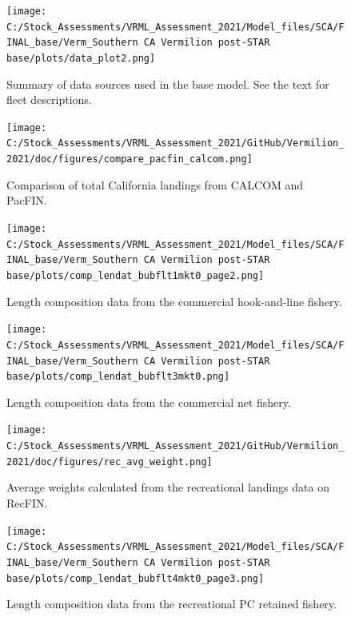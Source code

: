 \documentclass[11pt,
  english,
]{article}
\begin{document}
\begin{figure}
\centering
\texttt{[image: C:/Stock\_Assessments/VRML\_Assessment\_2021/Model\_files/SCA/FINAL\_base/Verm\_Southern CA Vermilion post-STAR base/plots/data\_plot2.png]}
\caption{Summary of data sources used in the base model. See the text for fleet descriptions.\label{fig:data-plot}}
\end{figure}

\begin{figure}
\centering
\texttt{[image: C:/Stock\_Assessments/VRML\_Assessment\_2021/GitHub/Vermilion\_2021/doc/figures/compare\_pacfin\_calcom.png]}
\caption{Comparison of total California landings from CALCOM and PacFIN.\label{fig:calcom-pacfin}}
\end{figure}

\FloatBarrier

\FloatBarrier

\begin{figure}
\centering
\texttt{[image: C:/Stock\_Assessments/VRML\_Assessment\_2021/Model\_files/SCA/FINAL\_base/Verm\_Southern CA Vermilion post-STAR base/plots/comp\_lendat\_bubflt1mkt0\_page2.png]}
\caption{Length composition data from the commercial hook-and-line fishery.\label{fig:len-data-COM-HKL}}
\end{figure}

\begin{figure}
\centering
\texttt{[image: C:/Stock\_Assessments/VRML\_Assessment\_2021/Model\_files/SCA/FINAL\_base/Verm\_Southern CA Vermilion post-STAR base/plots/comp\_lendat\_bubflt3mkt0.png]}
\caption{Length composition data from the commercial net fishery.\label{fig:len-data-COM-NET}}
\end{figure}

\begin{figure}
\centering
\texttt{[image: C:/Stock\_Assessments/VRML\_Assessment\_2021/GitHub/Vermilion\_2021/doc/figures/rec\_avg\_weight.png]}
\caption{Average weights calculated from the recreational landings data on RecFIN.\label{fig:rec-avg-weights}}
\end{figure}

\begin{figure}
\centering
\texttt{[image: C:/Stock\_Assessments/VRML\_Assessment\_2021/Model\_files/SCA/FINAL\_base/Verm\_Southern CA Vermilion post-STAR base/plots/comp\_lendat\_bubflt4mkt0\_page3.png]}
\caption{Length composition data from the recreational PC retained fishery.\label{fig:len-data-REC-PC}}
\end{figure}
\end{document}
